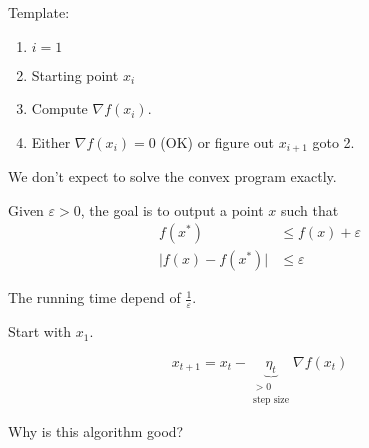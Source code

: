 Template:
\begin{enumerate}
    \item $i=1$
    \item Starting point $x_i$
    \item Compute $\nabla f(x_i)$.
    \item Either $\nabla f(x_i) = 0$ (OK) or figure out $x_{i+1}$ goto 2.
\end{enumerate}

We don't expect to solve the convex program exactly.

Given $\varepsilon > 0$, the goal is to output a point $x$ such that
\[
    \begin{aligned}
	    f(x^*) &\leqslant f(x)  + \varepsilon\\
	    \lvert f(x)-f(x^*)\rvert &\leqslant \varepsilon
    \end{aligned}
\]

The running time depend of $\frac{1}{\varepsilon}$.


Start with $x_1$.

\[
    x_{t+1} = x_t - \underbrace{\eta_t}_{\substack{>0\\\text{step size}}} \nabla f(x_t)
\]

Why is this algorithm good?

